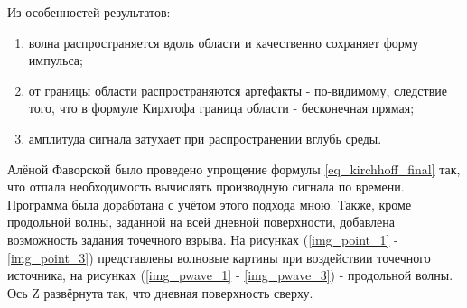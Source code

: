 \documentclass{article}
\begin{document}
Из особенностей результатов:
\begin{enumerate}
\item волна распространяется вдоль области и качественно сохраняет форму импульса;
\item от границы области распространяются артефакты - по-видимому, следствие того, что
в формуле Кирхгофа граница области - бесконечная прямая;
\item амплитуда сигнала затухает при распространении вглубь среды.
\end{enumerate}

Алёной Фаворской было проведено упрощение формулы \ref{eq_kirchhoff_final} так, что отпала необходимость вычислять производную
сигнала по времени.
Программа была доработана с учётом этого подхода мною.
Также, кроме продольной волны, заданной на всей дневной поверхности, добавлена возможность задания точечного взрыва.
На рисунках (\ref{img_point_1} - \ref{img_point_3}) представлены волновые картины при воздействии точечного источника,
на рисунках (\ref{img_pwave_1} - \ref{img_pwave_3}) - продольной волны.
Ось Z развёрнута так, что дневная поверхность сверху.
\end{document}
